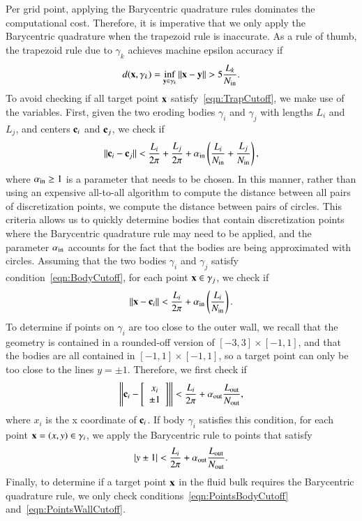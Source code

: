 \documentclass[preprint, 10pt]{elsarticle}
\begin{document}
Per grid point, applying the Barycentric quadrature rules dominates the
computational cost. Therefore, it is imperative that we only apply the
Barycentric quadrature when the trapezoid rule is inaccurate.  As a rule
of thumb, the trapezoid rule due to $\gamma_k$ achieves machine epsilon
accuracy if~\cite{bar2014}
\begin{align}
  \label{eqn:TrapCutoff}
  d({\mathbf{x}},\gamma_k) = \inf_{{\mathbf{y}} \in \gamma_k} \|{\mathbf{x}} - {\mathbf{y}}\| > 
    5 \frac{L_k}{N_{\mathrm{in}}}.
\end{align}
To avoid checking if all target point ${\mathbf{x}}$
satisfy~\eqref{eqn:TrapCutoff}, we make use of the {\thL} variables.
First, given the two eroding bodies $\gamma_i$ and $\gamma_j$ with
lengths $L_i$ and $L_j$, and centers ${\mathbf{c}}_i$ and ${\mathbf{c}}_j$, we check if
\begin{align}
  \label{eqn:BodyCutoff}
  \|{\mathbf{c}}_i - {\mathbf{c}}_j\| < \frac{L_i}{2\pi} + \frac{L_j}{2\pi} + 
    \alpha_{\mathrm{in}} \left(\frac{L_i}{N_{\mathrm{in}}} + \frac{L_j}{N_{\mathrm{in}}} \right),
\end{align}
where $\alpha_{\mathrm{in}} \geq 1$ is a parameter that needs to be chosen.  In
this manner, rather than using an expensive all-to-all algorithm to
compute the distance between all pairs of discretization points, we
compute the distance between pairs of circles.  This criteria allows us
to quickly determine bodies that contain discretization points where the
Barycentric quadrature rule may need to be applied, and the parameter
$\alpha_{\mathrm{in}}$ accounts for the fact that the bodies are being
approximated with circles.  Assuming that the two bodies $\gamma_i$ and
$\gamma_j$ satisfy condition~\eqref{eqn:BodyCutoff}, for each point ${\mathbf{x}}
\in \gamma_j$, we check if
\begin{align}
  \label{eqn:PointsBodyCutoff}
  \|{\mathbf{x}} - {\mathbf{c}}_i\| < \frac{L_i}{2\pi}
+ \alpha_{\mathrm{in}} \left(\frac{L_i}{N_{\mathrm{in}}} \right).
\end{align}
To determine if points on $\gamma_i$ are too close to the outer wall, we
recall that the geometry is contained in a rounded-off version of
$[-3,3] \times [-1,1]$, and that the bodies are all contained in $[-1,1]
\times [-1,1]$, so a target point can only be too close to the lines $y
= \pm 1$. Therefore, we first check if
\begin{align}
  \left\|{\mathbf{c}}_i - \left[
    \begin{array}{c}
      x_i \\ \pm 1
    \end{array}
    \right]
  \right\| < \frac{L_i}{2 \pi} + \alpha_{\mathrm{out}} \frac{L_{\mathrm{out}}}{N_{\mathrm{out}}},
\end{align}
where $x_i$ is the x coordinate of ${\mathbf{c}}_i$. If body $\gamma_i$ satisfies
this condition, for each point ${\mathbf{x}}=(x,y) \in \gamma_i$, we apply the
Barycentric rule to points that satisfy
\begin{align}
  \label{eqn:PointsWallCutoff}
  |y \pm 1| < \frac{L_i}{2 \pi} +\alpha_{\mathrm{out}} \frac{L_{\mathrm{out}}}{N_{\mathrm{out}}}.
\end{align}
Finally, to determine if a target point ${\mathbf{x}}$ in the fluid bulk requires
the Barycentric quadrature rule, we only check
conditions~\eqref{eqn:PointsBodyCutoff}
and~\eqref{eqn:PointsWallCutoff}.  
\end{document}
